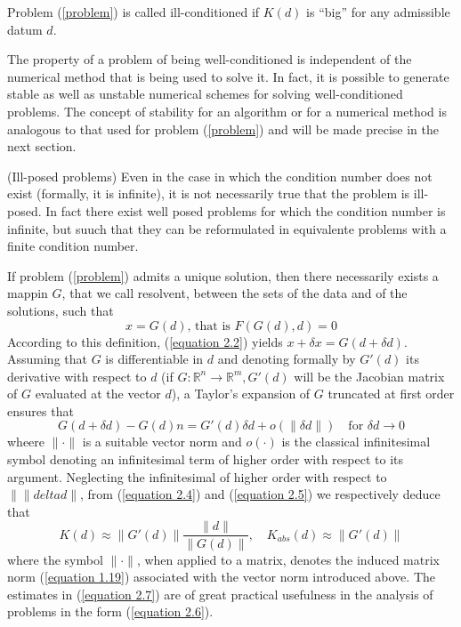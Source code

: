 Problem (\ref{problem}) is called ill-conditioned if  $K(d)$ is ``big'' for any admissible datum $d$.

The property of a problem of being well-conditioned is independent of the numerical method that is being used to solve it. In fact, it is possible to generate stable as well as unstable numerical schemes for solving well-conditioned problems. The concept of stability  for an algorithm or for a numerical method is analogous to that used for problem (\ref{problem}) and will be made precise in the next section.

\begin{remark}
    (Ill-posed problems) Even in the case in which the condition number does not exist (formally, it is infinite), it is not necessarily true that the problem is ill-posed. In fact there exist well posed problems for which the condition number is infinite, but suuch that they can be reformulated in equivalente problems with a finite condition number.
\end{remark}

If problem (\ref{problem}) admits a unique solution, then there necessarily exists a mappin $G$, that we call resolvent, between the sets of the data and of the solutions, such that
\begin{equation}
    x = G(d) \text{, that is } F(G(d), d) = 0
    \label{equation 2.6}
\end{equation}
According to this definition, (\ref{equation 2.2}) yields $x + \delta x = G(d + \delta d)$. Assuming that $G$ is differentiable in $d$ and denoting formally by $G'(d)$ its derivative with respect to $d$ (if $G: \mathbb{R}^n \rightarrow \mathbb{R}^m, G'(d)$ will be the Jacobian matrix of $G$ evaluated at the vector $d$), a Taylor's expansion of $G$ truncated at first order ensures that 
\[G(d + \delta d) - G(d) n= G'(d) \delta d + o(\| \delta d \|) \quad \text{for } \delta d \rightarrow 0 \]
wheere $\| \cdot \|$ is a suitable vector norm and $o(\cdot)$ is the classical infinitesimal symbol denoting an infinitesimal term of higher order with respect to its argument. Neglecting the infinitesimal of higher order with respect to $\| \|delta d \|$, from (\ref{equation 2.4}) and (\ref{equation 2.5}) we respectively deduce that
\begin{equation}
    K(d) \approx \| G'(d) \| \frac{\| d \|}{\| G(d) \|}, \quad K_{abs}(d) \approx \| G'(d) \|
    \label{equation 2.7}
\end{equation}
where the symbol $\| \cdot \|$, when applied to a matrix, denotes the induced matrix norm (\ref{equation 1.19}) associated with the vector norm introduced above. The estimates in (\ref{equation 2.7}) are of great practical usefulness in the analysis of problems in the form (\ref{equation 2.6}).

